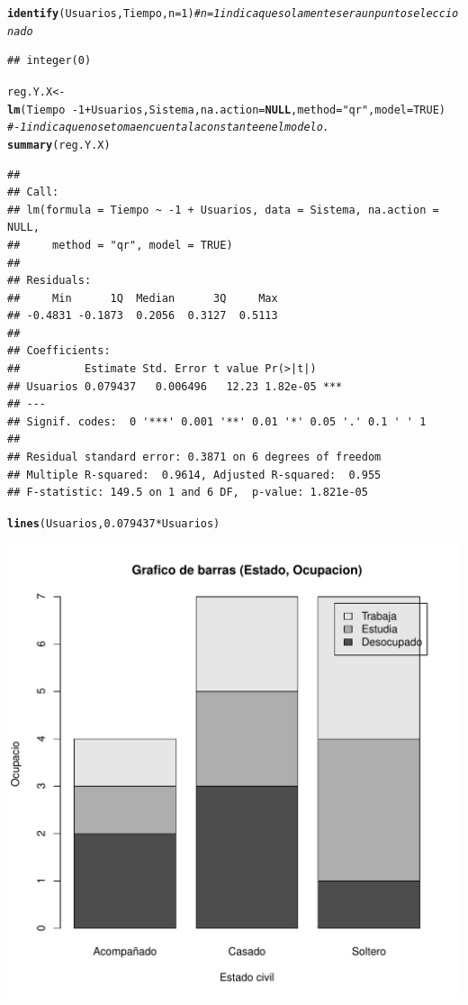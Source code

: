\documentclass{article}\usepackage[]{graphicx}\usepackage[]{color}
\makeatletter
\def\maxwidth{ %
  \ifdim\Gin@nat@width>\linewidth
    \linewidth
  \else
    \Gin@nat@width
  \fi
}
\newcommand{\hlnum}[1]{\textcolor[rgb]{0.686,0.059,0.569}{#1}}%
\newcommand{\hlstr}[1]{\textcolor[rgb]{0.192,0.494,0.8}{#1}}%
\newcommand{\hlcom}[1]{\textcolor[rgb]{0.678,0.584,0.686}{\textit{#1}}}%
\newcommand{\hlopt}[1]{\textcolor[rgb]{0,0,0}{#1}}%
\newcommand{\hlstd}[1]{\textcolor[rgb]{0.345,0.345,0.345}{#1}}%
\newcommand{\hlkwa}[1]{\textcolor[rgb]{0.161,0.373,0.58}{\textbf{#1}}}%
\newcommand{\hlkwb}[1]{\textcolor[rgb]{0.69,0.353,0.396}{#1}}%
\newcommand{\hlkwc}[1]{\textcolor[rgb]{0.333,0.667,0.333}{#1}}%
\newcommand{\hlkwd}[1]{\textcolor[rgb]{0.737,0.353,0.396}{\textbf{#1}}}%
\newenvironment{kframe}{%
 \def\at@end@of@kframe{}%
 \ifinner\ifhmode%
  \def\at@end@of@kframe{\end{minipage}}%
  \begin{minipage}{\columnwidth}%
 \fi\fi%
 \def\FrameCommand##1{\hskip\@totalleftmargin \hskip-\fboxsep
 \colorbox{shadecolor}{##1}\hskip-\fboxsep
     \hskip-\linewidth \hskip-\@totalleftmargin \hskip\columnwidth}%
 \MakeFramed {\advance\hsize-\width
   \@totalleftmargin\z@ \linewidth\hsize
   \@setminipage}}%
 {\par\unskip\endMakeFramed%
 \at@end@of@kframe}
\newenvironment{knitrout}{}{} %
\makeatother
\begin{document}
\begin{knitrout}
\begin{kframe}
\begin{alltt}
\hlkwd{identify}\hlstd{(Usuarios, Tiempo,} \hlkwc{n}\hlstd{=}\hlnum{1}\hlstd{)} \hlcom{# n=1 indica que solamente sera un punto seleccionado}
\end{alltt}
\begin{verbatim}
## integer(0)
\end{verbatim}
\begin{alltt}
\hlstd{reg.Y.X} \hlkwb{<-} \hlkwd{lm}\hlstd{(Tiempo} \hlopt{~ -}\hlnum{1} \hlopt{+} \hlstd{Usuarios, Sistema,} \hlkwc{na.action}\hlstd{=}\hlkwa{NULL}\hlstd{,} \hlkwc{method}\hlstd{=}\hlstr{"qr"}\hlstd{,} \hlkwc{model}\hlstd{=}\hlnum{TRUE}\hlstd{)}
\hlcom{#-1 indica que no se toma en cuenta la constante en el modelo.}
\hlkwd{summary}\hlstd{(reg.Y.X)}
\end{alltt}
\begin{verbatim}
## 
## Call:
## lm(formula = Tiempo ~ -1 + Usuarios, data = Sistema, na.action = NULL, 
##     method = "qr", model = TRUE)
## 
## Residuals:
##     Min      1Q  Median      3Q     Max 
## -0.4831 -0.1873  0.2056  0.3127  0.5113 
## 
## Coefficients:
##          Estimate Std. Error t value Pr(>|t|)    
## Usuarios 0.079437   0.006496   12.23 1.82e-05 ***
## ---
## Signif. codes:  0 '***' 0.001 '**' 0.01 '*' 0.05 '.' 0.1 ' ' 1
## 
## Residual standard error: 0.3871 on 6 degrees of freedom
## Multiple R-squared:  0.9614,	Adjusted R-squared:  0.955 
## F-statistic: 149.5 on 1 and 6 DF,  p-value: 1.821e-05
\end{verbatim}
\begin{alltt}
\hlkwd{lines}\hlstd{(Usuarios,} \hlnum{0.079437}\hlopt{*}\hlstd{Usuarios)}
\end{alltt}
\end{kframe}
\includegraphics[width=\maxwidth]{figure/unnamed-chunk-1-1} 

\end{knitrout}
\end{document}
